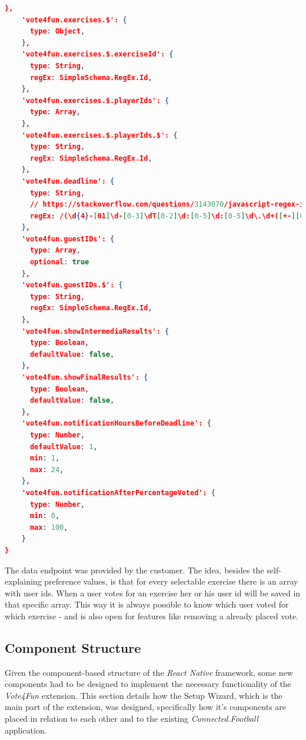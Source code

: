 \begin{lstlisting}[language=json,caption=\textit{Vote4Fun \textit{JSON} Object },label=lst:vote4fun_json]
    },
    'vote4fun.exercises.$': {
      type: Object,
    },
    'vote4fun.exercises.$.exerciseId': {
      type: String,
      regEx: SimpleSchema.RegEx.Id,
    },
    'vote4fun.exercises.$.playerIds': {
      type: Array,
    },
    'vote4fun.exercises.$.playerIds.$': {
      type: String,
      regEx: SimpleSchema.RegEx.Id,
    },
    'vote4fun.deadline': {
      type: String,
      // https://stackoverflow.com/questions/3143070/javascript-regex-iso-datetime
      regEx: /(\d{4}-[01]\d-[0-3]\dT[0-2]\d:[0-5]\d:[0-5]\d\.\d+([+-][0-2]\d:[0-5]\d|Z))|(\d{4}-[01]\d-[0-3]\dT[0-2]\d:[0-5]\d:[0-5]\d([+-][0-2]\d:[0-5]\d|Z))|(\d{4}-[01]\d-[0-3]\dT[0-2]\d:[0-5]\d([+-][0-2]\d:[0-5]\d|Z))/,
    },
    'vote4fun.guestIDs': {
      type: Array,
      optional: true
    },
    'vote4fun.guestIDs.$': {
      type: String,
      regEx: SimpleSchema.RegEx.Id,
    },
    'vote4fun.showIntermediaResults': {
      type: Boolean,
      defaultValue: false,
    },
    'vote4fun.showFinalResults': {
      type: Boolean,
      defaultValue: false,
    },
    'vote4fun.notificationHoursBeforeDeadline': {
      type: Number,
      defaultValue: 1,
      min: 1,
      max: 24,
    },
    'vote4fun.notificationAfterPercentageVoted': {
      type: Number,
      min: 0,
      max: 100,
    }
}
\end{lstlisting}

The data endpoint was provided by the customer. The idea, besides the self-explaining preference values, is that for every selectable exercise there is an array with user ids. When a user votes for an exercise her or his user id will be saved in that specific array. This way it is always possible to know which user voted for which exercise - and is also open for features like removing a already placed vote.

\subsection{Component Structure}
\label{ssec:component_structure}

Given the component-based structure of the \textit{React Native} framework, some new components had to be designed to implement the necessary functionality of the \textit{Vote4Fun} extension. This section details how the Setup Wizard, which is the main part of the extension, was designed, specifically how it's components are placed in relation to each other and to the existing \textit{Connected.Football} application.

